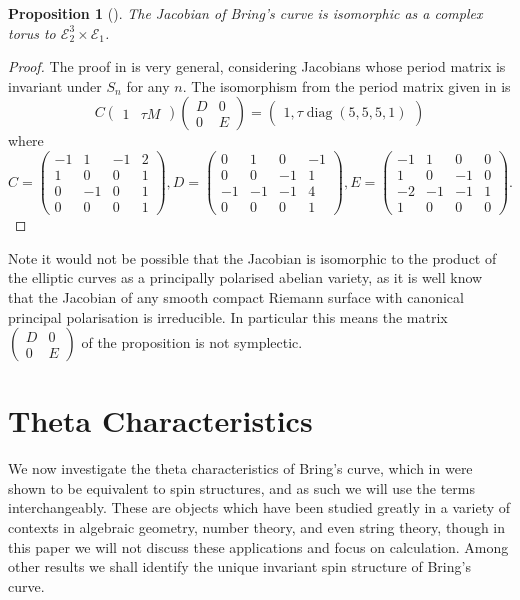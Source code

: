 \documentclass{amsart}
\newtheorem{prop}[theorem]{Proposition}
\begin{document}
\begin{prop}[\cite{Gonzalez2000}]
The Jacobian of Bring's curve is isomorphic as a complex torus to $\mathcal{E}_2^3 \times \mathcal{E}_1$.
\end{prop}
\begin{proof}
The proof in \cite{Gonzalez2000} is very general, considering Jacobians whose period matrix is invariant under $S_n$ for any $n$. The isomorphism from the period matrix given in \cite{Riera1992} is
$$
C \begin{pmatrix}
1 & \tau M
\end{pmatrix} \begin{pmatrix}
D & 0 \\ 0 & E
\end{pmatrix} = \begin{pmatrix}1, \tau \operatorname{diag}(5, 5, 5, 1) \end{pmatrix}
$$ 
where
$$
C = \begin{pmatrix}
-1 & 1 & -1 & 2 \\ 1 & 0 & 0 & 1 \\ 0 & -1 & 0 & 1 \\ 0 & 0 & 0 & 1
\end{pmatrix},  D = \begin{pmatrix}
0 & 1 & 0 & -1 \\ 0 & 0 & -1 & 1 \\ -1 & -1 & -1 & 4 \\ 0 & 0 & 0 & 1
\end{pmatrix},  E = \begin{pmatrix}
-1 & 1 & 0 & 0 \\ 1 & 0 & -1 & 0 \\ -2 & -1 & -1 & 1 \\ 1 & 0 & 0 & 0
\end{pmatrix}  .
$$
\end{proof}
Note it would not be possible that the Jacobian is isomorphic to the product of the elliptic curves as a principally polarised abelian variety, as it is well know that the Jacobian of any smooth compact Riemann surface with canonical principal polarisation is irreducible. In particular this means the matrix $\begin{pmatrix}
D & 0 \\ 0 & E
\end{pmatrix}$ of the proposition is not symplectic.

\section{Theta Characteristics}\label{sec: theta characteristics}
We now investigate the theta characteristics of Bring's curve, which in \cite{Atiyah1971} were shown to be equivalent to spin structures, and as such we will use the terms interchangeably. These are objects which have been studied greatly in a variety of contexts in algebraic geometry, number theory, and even string theory, though in this paper we will not discuss these applications and focus on calculation. Among other results we shall identify the unique invariant spin structure of Bring's curve.
\end{document}
